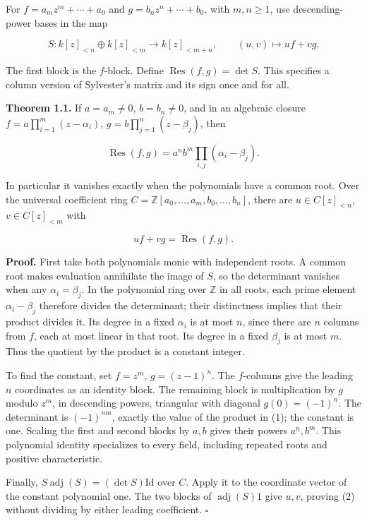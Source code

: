 \documentclass[
]{article}
\begin{document}
For \(f=a_m z^m+\cdots+a_0\) and \(g=b_nz^n+\cdots+b_0\), with
\(m,n\ge1\), use descending-power bases in the map

\[
S:k[z]_{<n}\oplus k[z]_{<m}\longrightarrow k[z]_{<m+n},
\qquad (u,v)\longmapsto uf+vg.
\]

The first block is the \(f\)-block. Define
\(\operatorname{Res}(f,g)=\det S\). This specifies a column version of
Sylvester's matrix and its sign once and for all.

\textbf{Theorem 1.1.} If \(a=a_m\ne0\), \(b=b_n\ne0\), and in an
algebraic closure \(f=a\prod_{i=1}^m(z-\alpha_i)\),
\(g=b\prod_{j=1}^n(z-\beta_j)\), then

\[
\operatorname{Res}(f,g)=a^n b^m\prod_{i,j}(\alpha_i-\beta_j).
\tag{1}
\]

In particular it vanishes exactly when the polynomials have a common
root. Over the universal coefficient ring
\(C=\mathbb Z[a_0,\ldots,a_m,b_0,\ldots,b_n]\), there are
\(u\in C[z]_{<n}\), \(v\in C[z]_{<m}\) with

\[
uf+vg=\operatorname{Res}(f,g).
\tag{2}
\]

\textbf{Proof.} First take both polynomials monic with independent
roots. A common root makes evaluation annihilate the image of \(S\), so
the determinant vanishes when any \(\alpha_i=\beta_j\). In the
polynomial ring over \(\mathbb Z\) in all roots, each prime element
\(\alpha_i-\beta_j\) therefore divides the determinant; their
distinctness implies that their product divides it. Its degree in a
fixed \(\alpha_i\) is at most \(n\), since there are \(n\) columns from
\(f\), each at most linear in that root. Its degree in a fixed
\(\beta_j\) is at most \(m\). Thus the quotient by the product is a
constant integer.

To find the constant, set \(f=z^m\), \(g=(z-1)^n\). The \(f\)-columns
give the leading \(n\) coordinates as an identity block. The remaining
block is multiplication by \(g\) modulo \(z^m\), in descending powers,
triangular with diagonal \(g(0)=(-1)^n\). The determinant is
\((-1)^{mn}\), exactly the value of the product in (1); the constant is
one. Scaling the first and second blocks by \(a,b\) gives their powers
\(a^n,b^m\). This polynomial identity specializes to every field,
including repeated roots and positive characteristic.

Finally, \(S\operatorname{adj}(S)=(\det S)\mathrm{Id}\) over \(C\).
Apply it to the coordinate vector of the constant polynomial one. The
two blocks of \(\operatorname{adj}(S)1\) give \(u,v\), proving (2)
without dividing by either leading coefficient. \(\square\)
\end{document}
